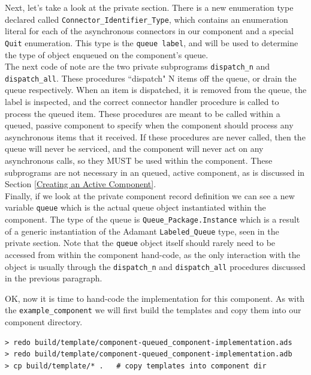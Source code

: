 Next, let's take a look at the private section. There is a new enumeration type declared called \texttt{Connector\_Identifier\_Type}, which contains an enumeration literal for each of the asynchronous connectors in our component and a special \texttt{Quit} enumeration. This type is the \texttt{queue label}, and will be used to determine the type of object enqueued on the component's queue. \\

The next code of note are the two private subprograms \texttt{dispatch\_n} and \texttt{dispatch\_all}. These procedures ``dispatch" N items off the queue, or drain the queue respectively. When an item is dispatched, it is removed from the queue, the label is inspected, and the correct connector handler procedure is called to process the queued item. These procedures are meant to be called within a queued, passive component to specify when the component should process any asynchronous items that it received. If these procedures are never called, then the queue will never be serviced, and the component will never act on any asynchronous calls, so they MUST be used within the component. These subprograms are not necessary in an queued, active component, as is discussed in Section \ref{Creating an Active Component}. \\

Finally, if we look at the private component record definition we can see a new variable \texttt{queue} which is the actual queue object instantiated within the component. The type of the queue is \texttt{Queue\_Package.Instance} which is a result of a generic instantiation of the Adamant \texttt{Labeled\_Queue} type, seen in the private section. Note that the \texttt{queue} object itself should rarely need to be accessed from within the component hand-code, as the only interaction with the object is usually through the \texttt{dispatch\_n} and \texttt{dispatch\_all} procedures discussed in the previous paragraph.

OK, now it is time to hand-code the implementation for this component. As with the \texttt{example\_component} we will first build the templates and copy them into our component directory.

\vspace{5mm} %
\begin{verbatim}
> redo build/template/component-queued_component-implementation.ads 
> redo build/template/component-queued_component-implementation.adb 
> cp build/template/* .   # copy templates into component dir
\end{verbatim}
\vspace{5mm} %

